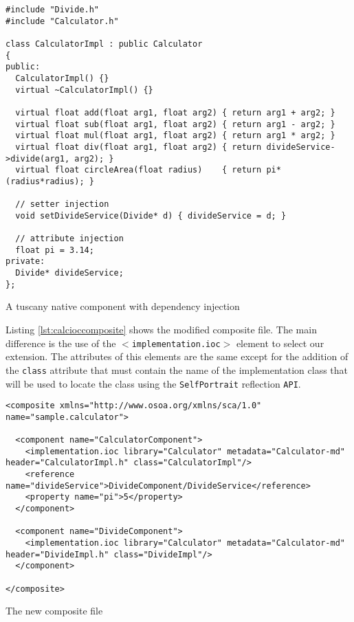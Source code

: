 \begin{listing}
\begin{verbatim}
#include "Divide.h"
#include "Calculator.h"

class CalculatorImpl : public Calculator
{
public:
  CalculatorImpl() {}
  virtual ~CalculatorImpl() {}

  virtual float add(float arg1, float arg2) { return arg1 + arg2; }
  virtual float sub(float arg1, float arg2) { return arg1 - arg2; }
  virtual float mul(float arg1, float arg2) { return arg1 * arg2; }
  virtual float div(float arg1, float arg2) { return divideService->divide(arg1, arg2); }
  virtual float circleArea(float radius)    { return pi*(radius*radius); }

  // setter injection
  void setDivideService(Divide* d) { divideService = d; }

  // attribute injection
  float pi = 3.14;
private:
  Divide* divideService;
};
\end{verbatim}
\caption{A tuscany native component with dependency injection}
\label{lst:calcioccpp}
\end{listing}

Listing \ref{lst:calcioccomposite} shows the modified composite file. The main difference
is the use of the \texttt{$<$implementation.ioc$>$} element to select our extension. The attributes
of this elements are the same except for the addition of the \texttt{class} attribute that must
contain the name of the implementation class that will be used to locate the class using the
\texttt{SelfPortrait} reflection \texttt{API}.

\begin{listing}
\begin{verbatim}
<composite xmlns="http://www.osoa.org/xmlns/sca/1.0" name="sample.calculator">

  <component name="CalculatorComponent">
    <implementation.ioc library="Calculator" metadata="Calculator-md" header="CalculatorImpl.h" class="CalculatorImpl"/>
    <reference name="divideService">DivideComponent/DivideService</reference>
    <property name="pi">5</property>
  </component>
        
  <component name="DivideComponent">
    <implementation.ioc library="Calculator" metadata="Calculator-md" header="DivideImpl.h" class="DivideImpl"/>
  </component>

</composite>
\end{verbatim}
\caption{The new composite file}
\label{lst:calcioccomposite}
\end{listing}

